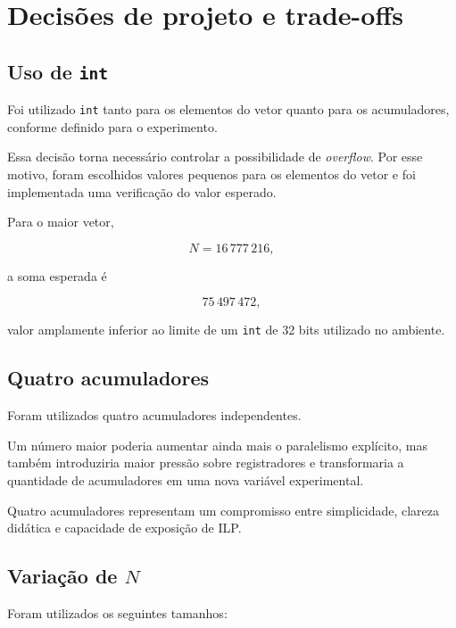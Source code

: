 \section{Decisões de projeto e trade-offs}

\label{sec:atvd02-decisoes}

\subsection{Uso de \texttt{int}}

Foi utilizado \texttt{int} tanto para os elementos do vetor quanto para os acumuladores,
conforme definido para o experimento.

Essa decisão torna necessário controlar a possibilidade de \textit{overflow}. Por esse motivo,
foram escolhidos valores pequenos para os elementos do vetor e foi implementada uma verificação
do valor esperado.

Para o maior vetor,

\begin{equation}
N=16\,777\,216,
\end{equation}

a soma esperada é

\begin{equation}
75\,497\,472,
\end{equation}

valor amplamente inferior ao limite de um \texttt{int} de 32 bits utilizado no ambiente.


\subsection{Quatro acumuladores}

Foram utilizados quatro acumuladores independentes.

Um número maior poderia aumentar ainda mais o paralelismo explícito, mas também introduziria
maior pressão sobre registradores e transformaria a quantidade de acumuladores em uma nova
variável experimental.

Quatro acumuladores representam um compromisso entre simplicidade, clareza didática e
capacidade de exposição de ILP.


\subsection{Variação de \(N\)}

Foram utilizados os seguintes tamanhos:

